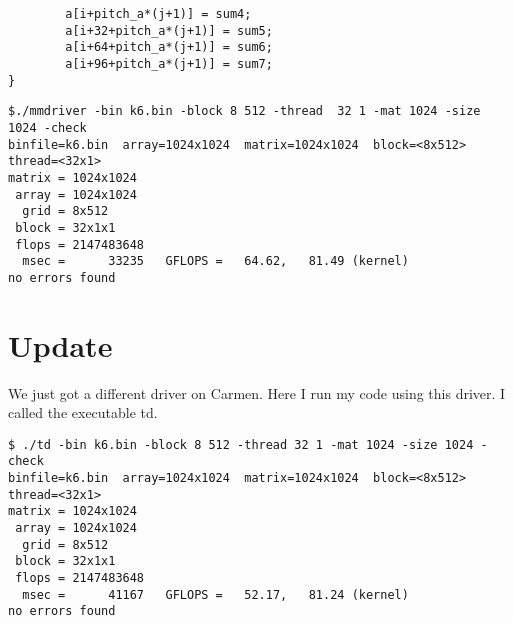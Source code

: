 \documentclass[11pt]{article}
\begin{document}
\begin{enumerate}
\begin{lstlisting}
        a[i+pitch_a*(j+1)] = sum4;
        a[i+32+pitch_a*(j+1)] = sum5;
        a[i+64+pitch_a*(j+1)] = sum6;
        a[i+96+pitch_a*(j+1)] = sum7;
}
\end{lstlisting}

\begin{lstlisting}
$./mmdriver -bin k6.bin -block 8 512 -thread  32 1 -mat 1024 -size 1024 -check
binfile=k6.bin  array=1024x1024  matrix=1024x1024  block=<8x512>  thread=<32x1>
matrix = 1024x1024
 array = 1024x1024
  grid = 8x512
 block = 32x1x1
 flops = 2147483648
  msec =      33235   GFLOPS =   64.62,   81.49 (kernel)
no errors found

\end{lstlisting}

\section*{Update}
We just got a different driver on Carmen. Here I run my code using this driver. I called the executable td.

\begin{lstlisting}
$ ./td -bin k6.bin -block 8 512 -thread 32 1 -mat 1024 -size 1024 -check
binfile=k6.bin  array=1024x1024  matrix=1024x1024  block=<8x512>  thread=<32x1>
matrix = 1024x1024
 array = 1024x1024
  grid = 8x512
 block = 32x1x1
 flops = 2147483648
  msec =      41167   GFLOPS =   52.17,   81.24 (kernel)
no errors found

\end{lstlisting}

\end{enumerate}
\end{document}
